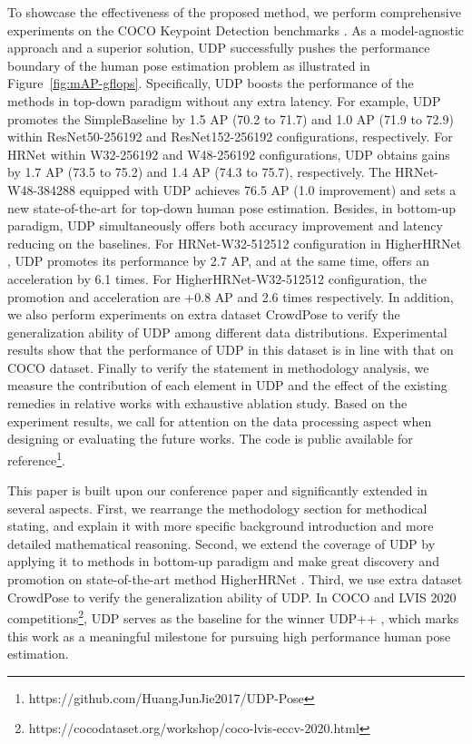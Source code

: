 \documentclass[10pt,journal,compsoc]{IEEEtran}
\begin{document}
To showcase the effectiveness of the proposed method, we perform comprehensive experiments on the COCO Keypoint Detection benchmarks \cite{COCO}. As a model-agnostic approach and a superior solution, UDP successfully pushes the performance boundary of the human pose estimation problem as illustrated in Figure~\ref{fig:mAP-gflops}. Specifically, UDP boosts the performance of the methods in top-down paradigm without any extra latency. For example, UDP promotes the SimpleBaseline \cite{SBNet} by 1.5 AP (70.2 to 71.7) and 1.0 AP (71.9 to 72.9) within ResNet50-256192 and ResNet152-256192 configurations, respectively. For HRNet \cite{HRNet} within W32-256192 and W48-256192 configurations, UDP obtains gains by 1.7 AP (73.5 to 75.2) and 1.4 AP (74.3 to 75.7), respectively. The HRNet-W48-384288 equipped with UDP achieves 76.5 AP (1.0 improvement) and sets a new state-of-the-art for top-down human pose estimation. Besides, in bottom-up paradigm, UDP simultaneously offers both accuracy improvement and latency reducing on the baselines. For HRNet-W32-512512 configuration in HigherHRNet \cite{Higher}, UDP promotes its performance by 2.7 AP, and at the same time, offers an acceleration by 6.1 times. For HigherHRNet-W32-512512 configuration, the promotion and acceleration are +0.8 AP and 2.6 times respectively. In addition, we also perform experiments on extra dataset CrowdPose \cite{Crowdpose} to verify the generalization ability of UDP among different data distributions. Experimental results show that the performance of UDP in this dataset is in line with that on COCO dataset. Finally to verify the statement in methodology analysis, we measure the contribution of each element in UDP and the effect of the existing remedies in relative works with exhaustive ablation study. Based on the experiment results, we call for attention on the data processing aspect when designing or evaluating the future works. The code is public available for reference\footnote{https://github.com/HuangJunJie2017/UDP-Pose}.



This paper is built upon our conference paper \cite{UDP} and significantly extended in several aspects. First, we rearrange the methodology section for methodical stating, and explain it with more specific background introduction and more detailed mathematical reasoning. Second, we extend the coverage of UDP by applying it to methods in bottom-up paradigm and make great discovery and promotion on state-of-the-art method HigherHRNet \cite{Higher}. Third, we use extra dataset CrowdPose \cite{Crowdpose} to verify the generalization ability of UDP. In COCO and LVIS 2020 competitions\footnote{https://cocodataset.org/workshop/coco-lvis-eccv-2020.html}, UDP serves as the baseline for the winner UDP++ \cite{UDP++}, which marks this work as a meaningful milestone for pursuing high performance human pose estimation.
\end{document}

